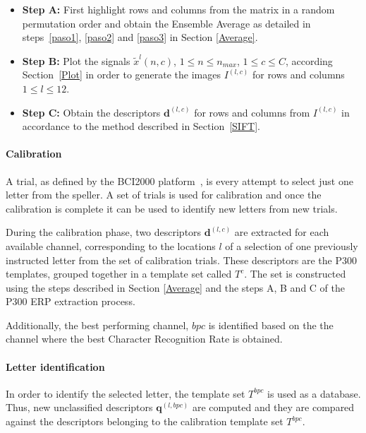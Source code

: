 \documentclass[utf8]{frontiersSCNS} %
\begin{document}
\begin{itemize}

\item \textbf{Step A:}\label{pasoa} First highlight rows and columns from the matrix in a random permutation order and obtain the Ensemble Average as detailed in steps~\ref{paso1}, \ref{paso2} and \ref{paso3} in Section \ref{Average}.
\item \textbf{Step B:}\label{paso4} Plot the signals $\tilde{x}^l(n,c)$,  $1 \leq n \leq n_{max}$, $1 \leq c \leq C $,  according Section~\ref{Plot} in order to generate the images $I^{(l,c)}$ for rows and columns $1 \leq l \leq 12$.

\item \textbf{Step C:} Obtain the descriptors $ \mathbf{d}^{(l,c)}$ for rows and columns from $I^{(l,c)}$  in accordance to the method described in Section~\ref{SIFT}. 

\end{itemize}

\paragraph{Calibration}

A trial, as defined by the BCI2000 platform~\citep{Schalk2004}, is every attempt to select just one letter from the speller.  A set of trials is used for calibration and once the calibration is complete it can be used to identify new letters from new trials.

During the calibration phase, two descriptors $ \mathbf{d}^{(l,c)}$ are extracted for each available channel, corresponding to the locations $l$ of a selection of one previously instructed letter from the set of calibration trials.  These descriptors are the P300 templates, grouped together in a template set called $ T^c $.   The set is constructed using the steps described in Section \ref{Average} and the steps A, B and C of the P300 ERP extraction process.

Additionally, the best performing channel, $bpc$ is identified based on the the channel where the best Character Recognition Rate is obtained.

\paragraph{Letter identification}

In order to identify the selected letter, the template set $T^{bpc}$ is used as a database.  Thus, new unclassified descriptors $\mathbf{q}^{(l,bpc)} $  are computed and they are compared against the descriptors belonging to the calibration template set $T^{bpc}$.
\end{document}
